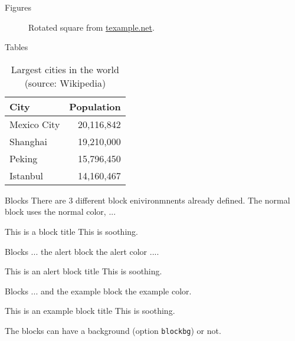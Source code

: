 \documentclass[10pt]{beamer}
\begin{document}
\begin{frame}{Figures}
  \begin{figure}
    \setcounter{density}{20}
    \caption{Rotated square from
    \href{http://www.texample.net/tikz/examples/rotated-polygons/}{texample.net}.}
  \end{figure}
\end{frame}
\begin{frame}{Tables}
  \begin{table}
    \caption{Largest cities in the world (source: Wikipedia)}
    \begin{tabular}{lr}
      \toprule
      City & Population\\
      \midrule
      Mexico City & 20,116,842\\
      Shanghai & 19,210,000\\
      Peking & 15,796,450\\
      Istanbul & 14,160,467\\
      \bottomrule
    \end{tabular}
  \end{table}
\end{frame}
\begin{frame}{Blocks}
  There are 3 different block enivironmnents already defined. The normal block uses the normal color, ...
  \begin{block}{This is a block title}
    This is soothing.
  \end{block}
\end{frame}
\begin{frame}{Blocks}
  ... the alert block the alert color ....
  \begin{alertblock}{This is an alert block title}
    This is soothing.
  \end{alertblock}
\end{frame}
\begin{frame}{Blocks}
  ... and the example block the example color.
  \begin{exampleblock}{This is an example block title}
    This is soothing.
  \end{exampleblock}
  The blocks can have a background (option \texttt{blockbg}) or not.
\end{frame}
\end{document}
